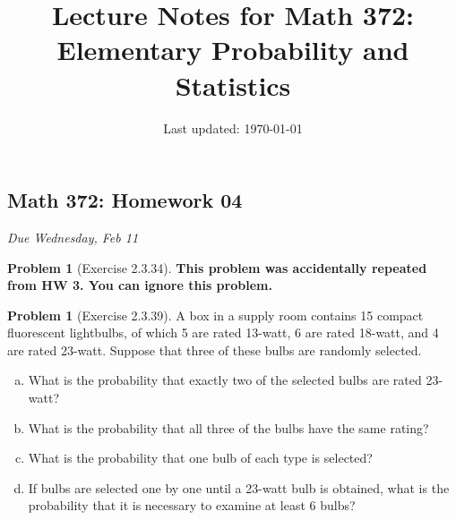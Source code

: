 \documentclass[10pt]{article}
\title{Lecture Notes for Math 372: \\Elementary Probability and Statistics}
\date{Last updated: \today}
\theoremstyle{definition}
\newtheorem{problem}[theorem]{Problem}
\newcommand{\1}[1]{\textbf{1}_{\left[#1\right]}} %
\begin{document}
\begin{center}
  \section*{Math 372: Homework 04}
  \textit{Due Wednesday, Feb 11}
\end{center}

\begin{problem}[Exercise 2.3.34]

  \textbf{This problem was accidentally repeated from HW 3. You can ignore
    this problem.}
  
\end{problem}

\begin{problem}[Exercise 2.3.39]
  A box in a supply room contains 15 compact fluorescent lightbulbs, of which
  5 are rated 13-watt, 6 are rated 18-watt, and 4 are rated 23-watt. Suppose
  that three of these bulbs are randomly selected.
  \begin{enumerate}[(a)]
    \item What is the probability that exactly two of the selected bulbs are
    rated 23-watt?
    \item What is the probability that all three of the bulbs have the same
    rating?
    \item What is the probability that one bulb of each type is selected?
    \item If bulbs are selected one by one until a 23-watt bulb is obtained,
    what is the probability that it is necessary to examine at least 6 bulbs?
  \end{enumerate}
\end{problem}
\end{document}

